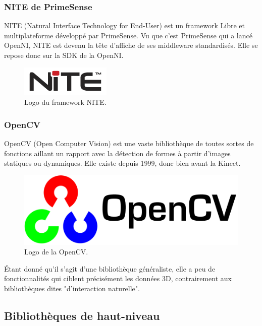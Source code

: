 \subsubsection{NITE de PrimeSense}
NITE (Natural Interface Technology for End-User) est un framework Libre et 
multiplateforme développé par PrimeSense. Vu que c'est PrimeSense qui a 
lancé OpenNI, NITE est devenu la tête d'affiche de ses
middleware standardisés. Elle se repose donc sur la SDK de la OpenNI. 
\begin{figure}[h!]
\centering
\includegraphics[width=0.3\linewidth]{images/nite_logo}
\caption{Logo du framework NITE.}
\end{figure}

\subsubsection{OpenCV}
OpenCV (Open Computer Vision) est une vaste bibliothèque de toutes sortes de 
fonctions aillant un rapport avec la détection de formes à partir d'images
statiques ou dynamiques. Elle existe depuis 1999, donc bien avant la Kinect.
\begin{figure}[h!]
\centering
\includegraphics[width=0.4\linewidth]{images/opencv_logo}
\caption{Logo de la OpenCV.}
\end{figure}
Étant donné qu'il s'agit d'une bibliothèque généraliste, elle a peu de 
fonctionnalités qui ciblent précisément les données 3D, contrairement aux 
bibliothèques dites "d'interaction naturelle".


\subsection{Bibliothèques de haut-niveau}


